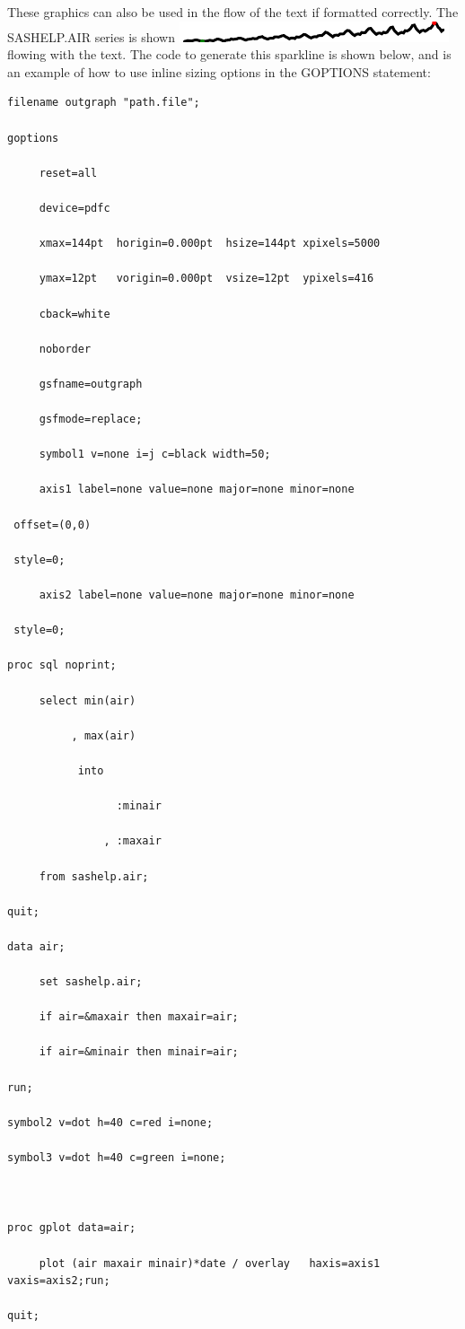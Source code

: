 \documentclass[10pt]{sugconf-ish}
\begin{document}
These graphics can also be used in the flow of the text if formatted correctly.  The SASHELP.AIR series is shown \includegraphics{Croker_airlineminmax.pdf} flowing with the text.  The code to generate this sparkline is shown below, and is an example of how to use inline sizing options in the GOPTIONS statement:
\scriptsize
\begin{verbatim}
filename outgraph "path.file"; 

goptions  

     reset=all 

     device=pdfc

     xmax=144pt  horigin=0.000pt  hsize=144pt xpixels=5000

     ymax=12pt   vorigin=0.000pt  vsize=12pt  ypixels=416

     cback=white

     noborder

     gsfname=outgraph

     gsfmode=replace;

     symbol1 v=none i=j c=black width=50;

     axis1 label=none value=none major=none minor=none 

 offset=(0,0)

 style=0; 

     axis2 label=none value=none major=none minor=none

 style=0;

proc sql noprint;

     select min(air)

          , max(air)    

           into 

                 :minair 

               , :maxair

     from sashelp.air;

quit;

data air;

     set sashelp.air;

     if air=&maxair then maxair=air;

     if air=&minair then minair=air;

run;

symbol2 v=dot h=40 c=red i=none;

symbol3 v=dot h=40 c=green i=none;



proc gplot data=air;

     plot (air maxair minair)*date / overlay   haxis=axis1 vaxis=axis2;run;

quit;

\end{verbatim}\normalsize
\end{document}
